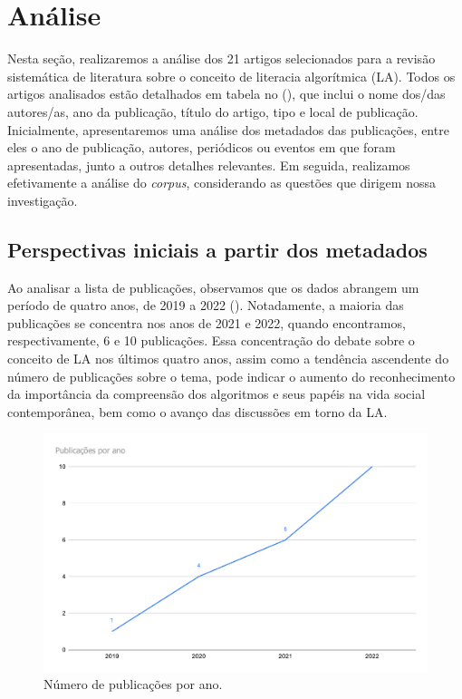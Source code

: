 \section{Análise}\label{sec-análise}

Nesta seção, realizaremos a análise dos 21 artigos selecionados para a
revisão sistemática de literatura sobre o conceito de literacia
algorítmica (LA). Todos os artigos analisados estão detalhados em tabela
no (), que inclui o nome dos/das autores/as, ano da
publicação, título do artigo, tipo e local de publicação. Inicialmente,
apresentaremos uma análise dos metadados das publicações, entre eles o
ano de publicação, autores, periódicos ou eventos em que foram
apresentadas, junto a outros detalhes relevantes. Em seguida, realizamos
efetivamente a análise do \emph{corpus}, considerando as questões que
dirigem nossa investigação.

\subsection{Perspectivas iniciais a partir dos metadados}\label{sub-sec-perspectivasiniciais}

Ao analisar a lista de publicações, observamos que os dados abrangem um
período de quatro anos, de 2019 a 2022 (). Notadamente, a
maioria das publicações se concentra nos anos de 2021 e 2022, quando
encontramos, respectivamente, 6 e 10 publicações. Essa concentração do
debate sobre o conceito de LA nos últimos quatro anos, assim como a
tendência ascendente do número de publicações sobre o tema, pode indicar
o aumento do reconhecimento da importância da compreensão dos algoritmos
e seus papéis na vida social contemporânea, bem como o avanço das
discussões em torno da LA.

\begin{figure}[!h]
\centering
\begin{minipage}{0.85\linewidth}
\caption{Número de publicações por ano.}
\label{image-02}
\includegraphics[width=\linewidth]{image2.pdf}
\end{minipage}
\end{figure}

